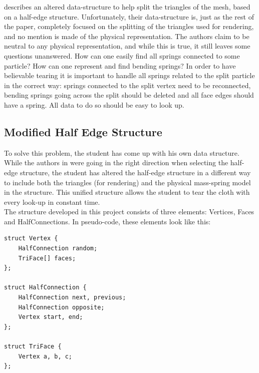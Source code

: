 \cite{fast_sim_tearing} describes an altered data-structure to help split the triangles of the mesh, based on a half-edge structure. Unfortunately, their data-structure is, just as the rest of the paper, completely focused on the splitting of the triangles used for rendering, and no mention is made of the physical representation. The authors claim to be neutral to any physical representation, and while this is true, it still leaves some questions unanswered. How can one easily find all springs connected to some particle? How can one represent and find bending springs? In order to have believable tearing it is important to handle all springs related to the split particle in the correct way: springs connected to the split vertex need to be reconnected, bending springs going across the split should be deleted and all face edges should have a spring. All data to do so should be easy to look up.\\

\subsection{Modified Half Edge Structure}

To solve this problem, the student has come up with his own data structure. While the authors in \cite{fast_sim_tearing} were going in the right direction when selecting the half-edge structure, the student has altered the half-edge structure in a different way to include both the triangles (for rendering) and the physical mass-spring model in the structure. This unified structure allows the student to tear the cloth with every look-up in constant time.\\

The structure developed in this project consists of three elements: Vertices, Faces and HalfConnections. In pseudo-code, these elements look like this:\\
\lstset{language=C}
\begin{lstlisting}
struct Vertex {
    HalfConnection random;
    TriFace[] faces;
};

struct HalfConnection {
    HalfConnection next, previous;
    HalfConnection opposite;
    Vertex start, end;
};

struct TriFace {
    Vertex a, b, c;
};
\end{lstlisting}

